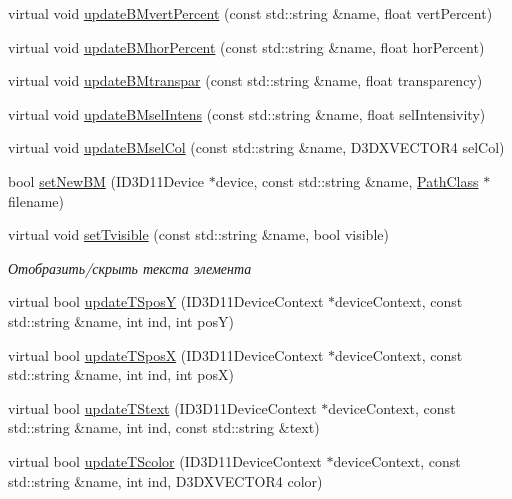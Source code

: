 \begin{DoxyCompactItemize}
virtual void \hyperlink{class_interface_element_class_aaf28d020efdb4ff5ad334e6577198e59}{update\+B\+Mvert\+Percent} (const std\+::string \&name, float vert\+Percent)
\item 
virtual void \hyperlink{class_interface_element_class_a4891a40d50c2cdad0227bf4d45651f25}{update\+B\+Mhor\+Percent} (const std\+::string \&name, float hor\+Percent)
\item 
virtual void \hyperlink{class_interface_element_class_adecf79076fdb4192adab5f74239b6b62}{update\+B\+Mtranspar} (const std\+::string \&name, float transparency)
\item 
virtual void \hyperlink{class_interface_element_class_a3855f9b8395a0d7571ebf86a55596ffa}{update\+B\+Msel\+Intens} (const std\+::string \&name, float sel\+Intensivity)
\item 
virtual void \hyperlink{class_interface_element_class_acd05ce4f703284b47bbfe6abb7a5026c}{update\+B\+Msel\+Col} (const std\+::string \&name, D3\+D\+X\+V\+E\+C\+T\+O\+R4 sel\+Col)
\item 
bool \hyperlink{class_interface_element_class_a91cdf8dd0c4ca5ec1a51588572ac07d4}{set\+New\+BM} (I\+D3\+D11\+Device $\ast$device, const std\+::string \&name, \hyperlink{class_path_class}{Path\+Class} $\ast$filename)
\item 
virtual void \hyperlink{class_interface_element_class_afbfd6e575119dee8d3bbca739354754e}{set\+Tvisible} (const std\+::string \&name, bool visible)
\begin{DoxyCompactList}\small\item\em Отобразить/скрыть текста элемента \end{DoxyCompactList}\item 
virtual bool \hyperlink{class_interface_element_class_afa2b0141aaaad7223ef087627aaa8570}{update\+T\+SposY} (I\+D3\+D11\+Device\+Context $\ast$device\+Context, const std\+::string \&name, int ind, int posY)
\item 
virtual bool \hyperlink{class_interface_element_class_a662b70e734c36fb0b792b7f9d8ab4eb1}{update\+T\+SposX} (I\+D3\+D11\+Device\+Context $\ast$device\+Context, const std\+::string \&name, int ind, int posX)
\item 
virtual bool \hyperlink{class_interface_element_class_a0cc96e120484d53c600515fefda32945}{update\+T\+Stext} (I\+D3\+D11\+Device\+Context $\ast$device\+Context, const std\+::string \&name, int ind, const std\+::string \&text)
\item 
virtual bool \hyperlink{class_interface_element_class_aceae624832991064f6b6e6f363911a5b}{update\+T\+Scolor} (I\+D3\+D11\+Device\+Context $\ast$device\+Context, const std\+::string \&name, int ind, D3\+D\+X\+V\+E\+C\+T\+O\+R4 color)

\end{DoxyCompactItemize}
